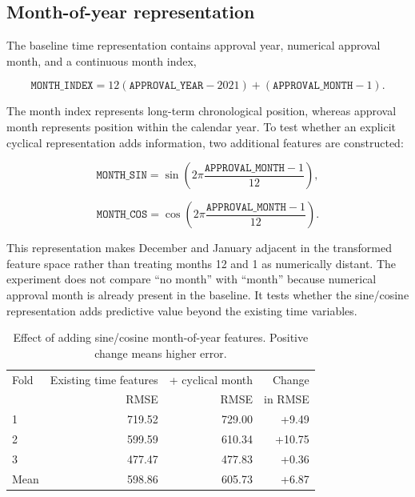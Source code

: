 \documentclass[10pt]{article}
\begin{document}
\subsection{Month-of-year representation}

The baseline time representation contains approval year, numerical approval month, and a continuous month index,

\begin{equation}
\texttt{MONTH\_INDEX}
=
12(\texttt{APPROVAL\_YEAR}-2021)
+
(\texttt{APPROVAL\_MONTH}-1).
\end{equation}

The month index represents long-term chronological position, whereas approval month represents position within the calendar year.
To test whether an explicit cyclical representation adds information, two additional features are constructed:

\begin{equation}
\texttt{MONTH\_SIN}
=
\sin\left(
2\pi
\frac{\texttt{APPROVAL\_MONTH}-1}{12}
\right),
\end{equation}

\begin{equation}
\texttt{MONTH\_COS}
=
\cos\left(
2\pi
\frac{\texttt{APPROVAL\_MONTH}-1}{12}
\right).
\end{equation}

This representation makes December and January adjacent in the transformed feature space rather than treating months 12 and 1 as numerically distant.
The experiment does not compare ``no month'' with ``month'' because numerical approval month is already present in the baseline.
It tests whether the sine/cosine representation adds predictive value beyond the existing time variables.

\begin{table}[h]
\centering
\small
\begin{tabular}{lrrr}
\toprule
Fold & Existing time features & + cyclical month & Change \\
 & RMSE & RMSE & in RMSE \\
\midrule
1 & 719.52 & 729.00 & +9.49 \\
2 & 599.59 & 610.34 & +10.75 \\
3 & 477.47 & 477.83 & +0.36 \\
\midrule
Mean & 598.86 & 605.73 & +6.87 \\
\bottomrule
\end{tabular}
\caption{Effect of adding sine/cosine month-of-year features. Positive change means higher error.}
\label{tab:cyclic-month}
\end{table}
\end{document}
